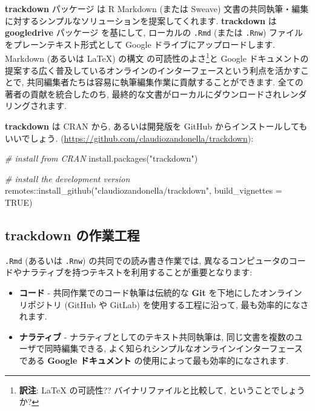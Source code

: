 \documentclass[
  11pt,
  lualatex,ja=standard,jafont=noto]{bxjsreport}
\newenvironment{Shaded}{\begin{snugshade}}{\end{snugshade}}
\newcommand{\AttributeTok}[1]{\textcolor[rgb]{0.77,0.63,0.00}{#1}}
\newcommand{\CommentTok}[1]{\textcolor[rgb]{0.56,0.35,0.01}{\textit{#1}}}
\newcommand{\ConstantTok}[1]{\textcolor[rgb]{0.00,0.00,0.00}{#1}}
\newcommand{\FunctionTok}[1]{\textcolor[rgb]{0.00,0.00,0.00}{#1}}
\newcommand{\NormalTok}[1]{#1}
\newcommand{\SpecialCharTok}[1]{\textcolor[rgb]{0.00,0.00,0.00}{#1}}
\newcommand{\StringTok}[1]{\textcolor[rgb]{0.31,0.60,0.02}{#1}}
\begin{document}
\textbf{trackdown} パッケージ \autocite{R-trackdown} は R Markdown (または Sweave) 文書の共同執筆・編集に対するシンプルなソリューションを提案してくれます. \textbf{trackdown} は \textbf{googledrive} パッケージ \autocite{R-googledrive} を基にして, ローカルの \texttt{.Rmd} (または \texttt{.Rnw}) ファイルをプレーンテキスト形式として Google ドライブにアップロードします. Markdown (あるいは LaTeX) の構文 の可読性のよさ\footnote{\textbf{訳注}: LaTeX の可読性?? バイナリファイルと比較して, ということでしょうか?}と Google ドキュメントの提案する広く普及しているオンラインのインターフェースという利点を活かすことで, 共同編集者たちは容易に執筆編集作業に貢献することができます. 全ての著者の貢献を統合したのち, 最終的な文書がローカルにダウンロードされレンダリングされます.

\textbf{trackdown} は CRAN から, あるいは開発版を GitHub からインストールしてもいいでしょう. (\url{https://github.com/claudiozandonella/trackdown}):

\begin{Shaded}
\begin{Highlighting}[numbers=left,,]
\CommentTok{\# install from CRAN}
\FunctionTok{install.packages}\NormalTok{(}\StringTok{"trackdown"}\NormalTok{)}

\CommentTok{\# install the development version}
\NormalTok{remotes}\SpecialCharTok{::}\FunctionTok{install\_github}\NormalTok{(}\StringTok{"claudiozandonella/trackdown"}\NormalTok{, }\AttributeTok{build\_vignettes =} \ConstantTok{TRUE}\NormalTok{)}
\end{Highlighting}
\end{Shaded}

\hypertarget{trackdown-ux306eux4f5cux696dux5de5ux7a0b}{%
\subsection{trackdown の作業工程}\label{trackdown-ux306eux4f5cux696dux5de5ux7a0b}}

\texttt{.Rmd} (あるいは \texttt{.Rnw}) の共同での読み書き作業では, 異なるコンピュータのコードやナラティブを持つテキストを利用することが重要となります:

\begin{itemize}
\item
  \textbf{コード} - 共同作業でのコード執筆は伝統的な \textbf{Git} を下地にしたオンラインリポジトリ (GitHub や GitLab) を使用する工程に沿って, 最も効率的になされます.
\item
  \textbf{ナラティブ} - ナラティブとしてのテキスト共同執筆は, 同じ文書を複数のユーザで同時編集できる, よく知られシンプルなオンラインインターフェースである \textbf{Google ドキュメント} の使用によって最も効率的になされます.
\end{itemize}
\end{document}
